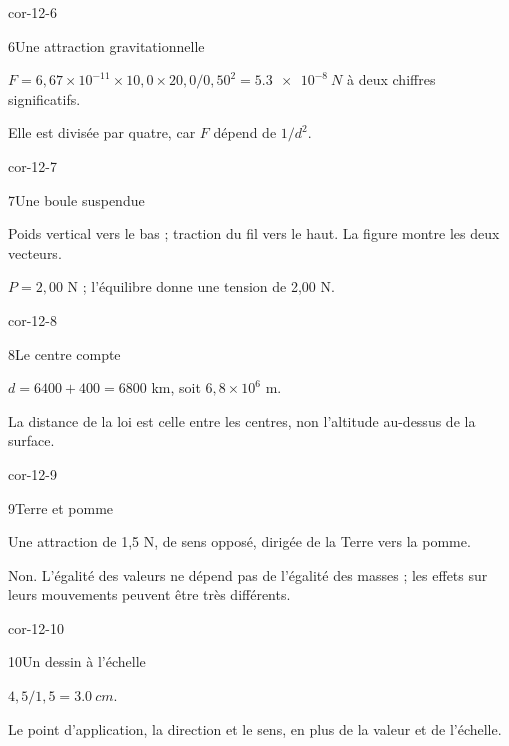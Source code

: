 \begin{blocLivre}{cor-12-6}\begin{corrige}{6}{Une attraction gravitationnelle}
\begin{questions}
\item $F=6,67\times10^{-11}\times10,0\times20,0/0,50^2=\qty{5,3e-8}{N}$ à deux chiffres significatifs.
\item Elle est divisée par quatre, car $F$ dépend de $1/d^2$.
\end{questions}
\end{corrige}\end{blocLivre}
\begin{blocLivre}{cor-12-7}\begin{corrige}{7}{Une boule suspendue}
\begin{questions}
\item Poids vertical vers le bas ; traction du fil vers le haut. La figure montre les deux vecteurs.
\item $P=2,00$ N ; l’équilibre donne une tension de 2,00 N.
\end{questions}
\end{corrige}\end{blocLivre}
\begin{blocLivre}{cor-12-8}\begin{corrige}{8}{Le centre compte}
\begin{questions}
\item $d=6400+400=6800$ km, soit $6,8\times10^6$ m.
\item La distance de la loi est celle entre les centres, non l’altitude au-dessus de la surface.
\end{questions}
\end{corrige}\end{blocLivre}
\clearpage
\begin{blocLivre}{cor-12-9}\begin{corrige}{9}{Terre et pomme}
\begin{questions}
\item Une attraction de 1,5 N, de sens opposé, dirigée de la Terre vers la pomme.
\item Non. L’égalité des valeurs ne dépend pas de l’égalité des masses ; les effets sur leurs mouvements peuvent être très différents.
\end{questions}
\end{corrige}\end{blocLivre}
\begin{blocLivre}{cor-12-10}\begin{corrige}{10}{Un dessin à l’échelle}
\begin{questions}
\item $4,5/1,5=\qty{3,0}{cm}$.
\item Le point d’application, la direction et le sens, en plus de la valeur et de l’échelle.
\end{questions}
\end{corrige}\end{blocLivre}
